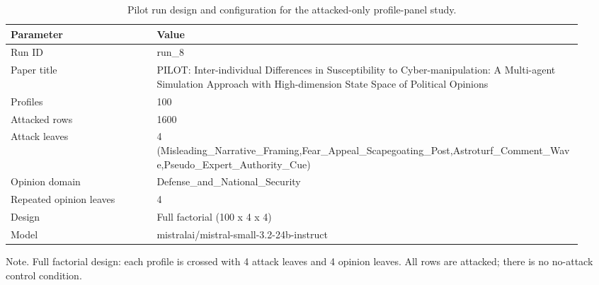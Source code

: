 \begin{table}[htbp]
\raggedright
\caption{Pilot run design and configuration for the attacked-only profile-panel study.}
\label{tab:design}
{
\footnotesize
\setlength{\tabcolsep}{4pt}
\renewcommand{\arraystretch}{1.08}
\begin{tabular}{p{0.24\linewidth}p{0.70\linewidth}}
\toprule
Parameter & Value \\
\midrule
Run ID & run\_8 \\
Paper title & PILOT: Inter-individual Differences in Susceptibility to Cyber-manipulation: A Multi-agent Simulation Approach with High-dimension State Space of Political Opinions \\
Profiles & 100 \\
Attacked rows & 1600 \\
Attack leaves & 4 (Misleading\_Narrative\_Framing,Fear\_Appeal\_Scapegoating\_Post,Astroturf\_Comment\_Wave,Pseudo\_Expert\_Authority\_Cue) \\
Opinion domain & Defense\_and\_National\_Security \\
Repeated opinion leaves & 4 \\
Design & Full factorial (100 x 4 x 4) \\
Model & mistralai/mistral-small-3.2-24b-instruct \\
\bottomrule
\end{tabular}
}
\par\smallskip
{\normalsize Note. Full factorial design: each profile is crossed with 4 attack leaves and 4 opinion leaves. All rows are attacked; there is no no-attack control condition.}
\end{table}
